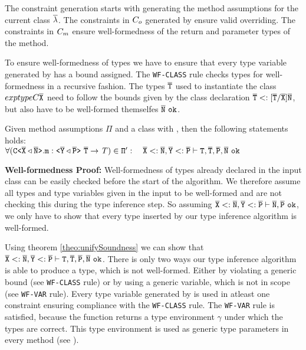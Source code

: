 The constraint generation starts with generating the method assumptions for the current class $\overline{\mathtt{\lambda}}$.
The constraints in $C_o$ generated by \fjtype{} ensure valid overriding.
The constraints in $C_m$ ensure well-formedness of the return and parameter types of the method.

To ensure well-formedness of types we have to ensure that every type variable generated by \fjtype{} has a bound assigned.
The \texttt{WF-CLASS} rule checks types for well-formedness in a recursive fashion.
The types $\overline{\tt T}$ used to instantiate the class $exptype{C}{\overline{\tt X}}$ need to follow the bounds given by the class declaration $\overline{\tt T} <: [\overline{\tt T}/\overline{\tt X}]\overline{\tt N}$, but also have to be well-formed themselfes $\overline{\tt N}\ \texttt{ok}$.
\begin{lemma}\label{lemma:well-formedness}
  Given method assumptions $\Pi$ and a class  with
  ,
  then the following statements holds:\\
  \normalfont $\forall (\exptype{C}{\ol{X} \triangleleft \ol{N}}.\texttt{m} : \exptype{}{\ol{Y} \triangleleft \ol{P}}\ \ol{\type{T}} \to \itype{T}) \in \mv{\Pi}': \quad \ol{X} <: \ol{N}, \ol{Y} <: \ol{P} \vdash \type{T}, \ol{T}, \ol{P}, \ol{N}\ \texttt{ok}$
\end{lemma}
\textbf{Well-formedness Proof:}
Well-formedness of types already declared in the input class can be easily checked before the start of the \fjtype{} algorithm.
We therefore assume all types and type variables given in the input to be well-formed and are not checking this during the type inference step.
So assuming $\ol{X} <: \ol{N}, \ol{Y} <: \ol{P} \vdash \ol{N}, \ol{P}\ \texttt{ok}$, we only have to show that every type inserted by our type inference algorithm is well-formed.

Using theorem \ref{theo:unifySoundness} we can show that $\overline{\tt X} <: \overline{\tt N}, \overline{\tt Y} <: \overline{\tt P} \vdash \texttt{T}, \overline{\tt T}, \overline{\tt P}, \overline{\tt N}\ \texttt{ok}$.
There is only two ways our type inference algorithm is able to produce a type, which is not well-formed.
Either by violating a generic bound (see \texttt{WF-CLASS} rule)
or by using a generic variable, which is not in scope (see \texttt{WF-VAR} rule).
Every type variable generated by \fjtype{} is used in atleast one constraint ensuring compliance with the \texttt{WF-CLASS} rule.
The \texttt{WF-VAR} rule is satisfied, because the \unify{} function returns a type environment $\gamma$ under which the types are correct.
This type environment is used as generic type parameters in every method (see \fjtypeinference{}). 

